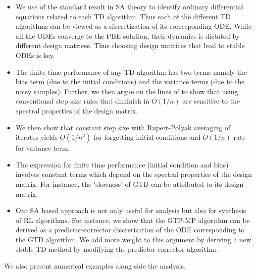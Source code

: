 \begin{itemize}[leftmargin=*] 
\item We use of the standard result in SA theory to identify ordinary differential equations related to each TD algorithm. Thus each of the different TD algorithms can be viewed as a discretization of its corresponding ODE. While all the ODEs converge to the PBE solution, their dynamics is dictated by different design matrices. Thus choosing design matrices that lead to stable ODEs is key.
\item The finite time performance of any TD algorithm has two terms namely the bias term (due to the initial conditions) and the variance terms (due to the noisy samples). Further, we then argue on the lines of \cite{} to show that using conventional step size rules that diminish in $O(1/n)$ are sensitive to the spectral properties of the design matrix.
\item We then show that constant step size with Rupert-Polyak averaging of iterates yields $O(1/n^2)$ for forgetting initial conditions and $O(1/n)$ rate for variance term.
\item The expression for finite time performance (initial condition and bias) involves constant terms which depend on the spectral properties of the design matrix. For instance, the `slowness’ of GTD can be attributed to its design matrix.
\item Our SA based approach is not only useful for analysis but also for synthesis of RL algorithms. For instance, we show that the GTP-MP algorithm can be derived as a predictor-corrector discretization of the ODE corresponding to the GTD algorithm. We add more weight to this argument by deriving a new stable TD method by modifying the predictor-corrector algorithm.
\end{itemize}
We also present numerical examples along side the analysis.
